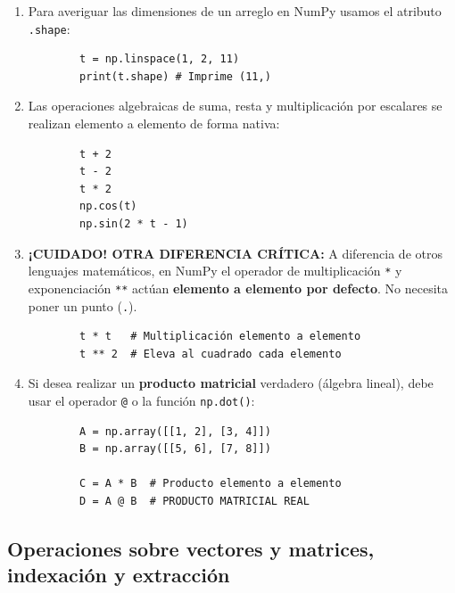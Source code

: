 \documentclass[11pt,a4paper,openany]{book}
\begin{document}
\begin{enumerate}
	\item Para averiguar las dimensiones de un arreglo en NumPy usamos el atributo \texttt{.shape}:
	\begin{verbatim}
		t = np.linspace(1, 2, 11)
		print(t.shape) # Imprime (11,)
	\end{verbatim}
	
	\item Las operaciones algebraicas de suma, resta y multiplicación por escalares se realizan elemento a elemento de forma nativa:
	\begin{verbatim}
		t + 2
		t - 2
		t * 2
		np.cos(t)
		np.sin(2 * t - 1)
	\end{verbatim}
	
	\item \textbf{¡CUIDADO! OTRA DIFERENCIA CRÍTICA:} A diferencia de otros lenguajes matemáticos, en NumPy el operador de multiplicación \texttt{*} y exponenciación \texttt{**} actúan \textbf{elemento a elemento por defecto}. No necesita poner un punto (\texttt{.}).
	\begin{verbatim}
		t * t   # Multiplicación elemento a elemento
		t ** 2  # Eleva al cuadrado cada elemento
	\end{verbatim}
	
	\item Si desea realizar un \textbf{producto matricial} verdadero (álgebra lineal), debe usar el operador \texttt{@} o la función \texttt{np.dot()}:
	\begin{verbatim}
		A = np.array([[1, 2], [3, 4]])
		B = np.array([[5, 6], [7, 8]])
		
		C = A * B  # Producto elemento a elemento
		D = A @ B  # PRODUCTO MATRICIAL REAL
	\end{verbatim}
\end{enumerate}

\subsection{Operaciones sobre vectores y matrices, indexación y extracción}
\end{document}
